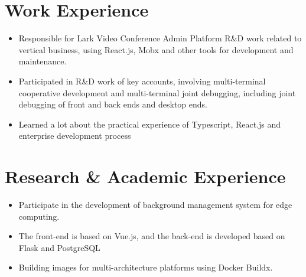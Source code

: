 \documentclass{resume}
\newcommand{\en}[1]{#1}
\newcommand{\zh}[1]{}
\begin{document}
\section{\en{Work Experience}\zh{工作经历}}
\en{}
\zh{\datedsubsection{\textbf{\href{https://www.bytedance.com/zh/}{字节跳动（ByteDance Inc.）}}}{2020/07 -- 2020/09}}
\en{}
\zh{\role{飞书会议室解决方案团队}{前端研发实习}}
\begin{itemize}
      \item \en{Responsible for Lark Video Conference Admin Platform R\&D work related to vertical business, using React.js, Mobx and other tools for development and maintenance.}
            \zh{负责飞书会议室 Admin 中会议室模块和视频会议模块相关垂直业务的前端研发，使用 React.js 和 Mobx 等工具进行业务等开发和维护}
      \item \en{Participated in R\&D work of key accounts, involving multi-terminal cooperative development and multi-terminal joint debugging, including joint debugging of front and back ends and desktop ends.}
            \zh{参与重点客户相关需求的开发，涉及到了多端合作开发与多端联合调试，包括前后端以及桌面端的联合调试}
      \item \en{Learned a lot about the practical experience of Typescript, React.js and enterprise development process}
            \zh{学到了很多关于 Typescript，React 以及企业级开发流程的实战经验}
\end{itemize}

\section{\en{Research \& Academic Experience}\zh{研究经历}}
\en{}
\zh{\datedsubsection{\textbf{中国科学院自动化研究所}}{2019/04 -- 2020/06}}
\en{}
\zh{\role{复杂系统管理与控制国家重点实验室}{科研实习}}
\begin{itemize}
      \item \en{Participate in the development of background management system for edge computing.}
            \zh{参与构建面向边缘计算的后台管理系统开发}
      \item \en{The front-end is based on Vue.js, and the back-end is developed based on Flask and PostgreSQL}
            \zh{前端基于 Vue.js 进行开发，后端基于 Flask 和 PostgreSQL 进行开发}
      \item \en{Building images for multi-architecture platforms using Docker Buildx.}
            \zh{使用 Docker Buildx 构建多系统架构支持的 Docker 镜像并部署}
\end{itemize}
\end{document}
